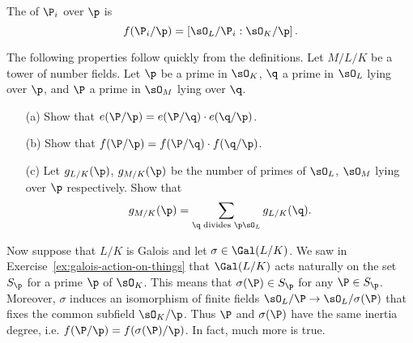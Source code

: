 \begin{definition}
  The 
  of $\P_i$ over $\p$ is
  \[
    f(\P_i/\p) = \left[\sO_L/\P_i : \sO_K/\p\right].
  \]
\end{definition}

\begin{exercise}\label{ex:ramificationmultiplicative}
  The following properties follow quickly from the definitions.
  Let $M/L/K$ be a tower of number fields. Let $\p$ be a prime
  in $\sO_K$, $\q$ a prime in $\sO_L$ lying over $\p$, and $\P$ a prime
  in $\sO_M$ lying over $\q$.
  \begin{enumerate}
    \item[(a)] Show that $e(\P/\p)=e(\P/\q) \cdot e(\q/\p)$.
    \item[(b)] Show that $f(\P/\p)=f(\P/\q) \cdot f(\q/\p)$.
    \item[(c)] Let $g_{L/K}(\p)$, $g_{M/K}(\p)$ be the number of primes
    of $\sO_L$, $\sO_M$ lying over $\p$ respectively. Show that
    \[
      g_{M/K}(\p) = \sum\limits_{\q \text{ divides } \p\sO_L} g_{L/K}(\q).
    \]
  \end{enumerate}
\end{exercise}

Now suppose that $L/K$ is Galois and let $\sigma\in\Gal(L/K)$.
We saw in Exercise~\ref{ex:galois-action-on-things} that $\Gal(L/K)$ acts
naturally on the set $S_\p$ for a prime $\p$ of $\sO_K$.
This means that $\sigma(\P) \in S_\p$ for any $\P \in S_\p$. Moreover,
$\sigma$ induces an isomorphism of finite fields $\sO_L/\P\to \sO_L/\sigma(\P)$
that fixes the common subfield $\sO_K/\p$. Thus $\P$ and $\sigma(\P)$ have
the same inertia degree, i.e. $f(\P/\p) = f(\sigma(\P)/\p)$.
In fact, much more is true.

